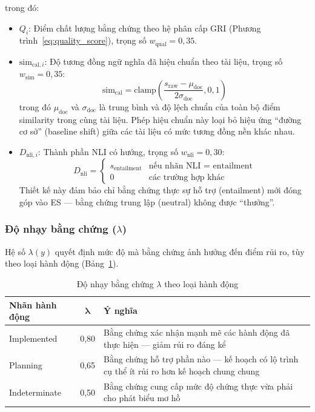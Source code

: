 \noindent trong đó:
\begin{itemize}
    \item $Q_i$: Điểm chất lượng bằng chứng theo hệ phân cấp GRI (Phương trình~\ref{eq:quality_score}), trọng số $w_{\text{qual}} = 0{,}35$.
    \item $\text{sim}_{\text{cal},i}$: Độ tương đồng ngữ nghĩa đã hiệu chuẩn theo tài liệu, trọng số $w_{\text{sim}} = 0{,}35$:
    \begin{equation}
        \text{sim}_{\text{cal}} = \text{clamp}\left(\frac{s_{\text{raw}} - \mu_{\text{doc}}}{2\sigma_{\text{doc}}}, 0, 1\right)
        \label{eq:calibrated_sim}
    \end{equation}
    trong đó $\mu_{\text{doc}}$ và $\sigma_{\text{doc}}$ là trung bình và độ lệch chuẩn của toàn bộ điểm similarity trong cùng tài liệu. Phép hiệu chuẩn này loại bỏ hiệu ứng ``đường cơ sở'' (baseline shift) giữa các tài liệu có mức tương đồng nền khác nhau.
    \item $D_{\text{nli},i}$: Thành phần NLI có hướng, trọng số $w_{\text{nli}} = 0{,}30$:
    \begin{equation}
        D_{\text{nli}} = \begin{cases}
            s_{\text{entailment}} & \text{nếu nhãn NLI = entailment} \\
            0 & \text{các trường hợp khác}
        \end{cases}
        \label{eq:directional_nli}
    \end{equation}
    Thiết kế này đảm bảo chỉ bằng chứng thực sự hỗ trợ (entailment) mới đóng góp vào ES --- bằng chứng trung lập (neutral) không được ``thưởng''.
\end{itemize}


\subsubsection{Độ nhạy bằng chứng ($\lambda$)}

Hệ số $\lambda(y)$ quyết định mức độ mà bằng chứng ảnh hưởng đến điểm rủi ro, tùy theo loại hành động (Bảng~\ref{tab:evidence_sensitivity}).

\begin{table}[htbp]
\centering
\caption{Độ nhạy bằng chứng $\lambda$ theo loại hành động}
\label{tab:evidence_sensitivity}
\small
\renewcommand{\arraystretch}{1.3}
\begin{tabular}{|l|c|p{8cm}|}
\hline
\textbf{Nhãn hành động} & $\boldsymbol{\lambda}$ & \textbf{Ý nghĩa} \\
\hline
Implemented & 0{,}80 & Bằng chứng xác nhận mạnh mẽ các hành động đã thực hiện --- giảm rủi ro đáng kể \\
\hline
Planning & 0{,}65 & Bằng chứng hỗ trợ phần nào --- kế hoạch có lộ trình cụ thể ít rủi ro hơn kế hoạch chung chung \\
\hline
Indeterminate & 0{,}50 & Bằng chứng cung cấp mức độ chứng thực vừa phải cho phát biểu mơ hồ \\
\hline
\end{tabular}
\end{table}


